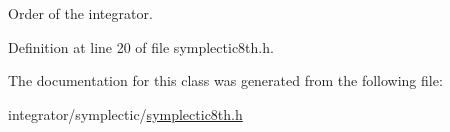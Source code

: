 Order of the integrator. 



Definition at line 20 of file symplectic8th.\+h.



The documentation for this class was generated from the following file\+:\begin{DoxyCompactItemize}
\item 
integrator/symplectic/\mbox{\hyperlink{symplectic8th_8h}{symplectic8th.\+h}}\end{DoxyCompactItemize}
